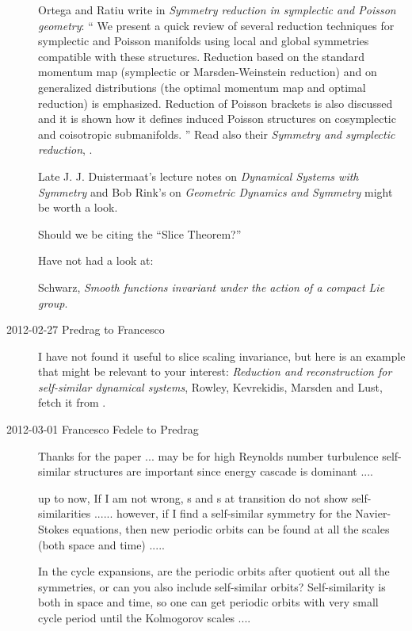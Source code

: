 \begin{description}
Ortega and Ratiu write in
\emph{Symmetry reduction in symplectic and {Poisson} geometry}: ``
We present a quick review of several reduction techniques for symplectic
and Poisson manifolds using local and global symmetries compatible with
these structures. Reduction based on the standard momentum map
(symplectic or Marsden-Weinstein reduction) and on generalized
distributions (the optimal momentum map and optimal reduction) is
emphasized. Reduction of Poisson brackets is also discussed and it is
shown how it defines induced Poisson structures on cosymplectic and
coisotropic submanifolds.
''
Read also their \emph{Symmetry and symplectic reduction}, .

Late J. J. Duistermaat's
{lecture notes} on \emph{Dynamical Systems with Symmetry} and Bob Rink's
 on
\emph{Geometric Dynamics and Symmetry} might be worth a look.


Should we be citing the ``Slice Theorem?''

Have not had a look at:

Schwarz,
\emph{Smooth functions invariant under the action of a compact {Lie} group}.

\item[2012-02-27 Predrag to Francesco]
I have not found it useful to slice scaling invariance, but here is an
example that might be relevant to your interest: \emph{Reduction and
reconstruction for self-similar dynamical systems}, Rowley, Kevrekidis,
Marsden and Lust, fetch it from
.

\item[2012-03-01 Francesco Fedele to Predrag]

Thanks for the paper ... may be for high Reynolds number turbulence
self-similar structures are important since energy cascade is dominant
....

up to now, If I am not wrong, \rpo s and \po s at transition
do not show self-similarities ...... however, if I find a
self-similar symmetry for the Navier-Stokes equations, then new
periodic orbits can be found at all the scales (both space and time)
.....

In the cycle expansions, are the periodic orbits after quotient out
all the symmetries, or can you also include self-similar orbits?
Self-similarity is both in space and time, so one can get periodic
orbits with very small cycle period until the Kolmogorov scales ....


\end{description}

